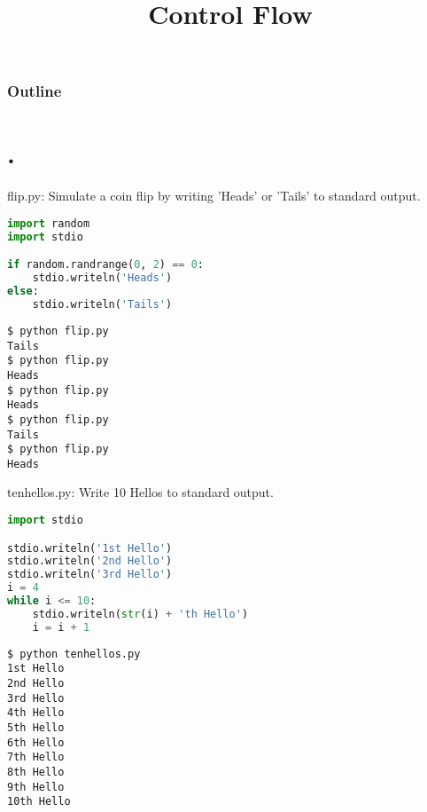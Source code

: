 \documentclass[8pt,a4paper,compress,handout]{beamer}
\title{Control Flow}
\date{}
\begin{document}
\begin{frame}
\vfill
\titlepage
\end{frame}

\begin{frame}
\frametitle{Outline}
\tableofcontents
\end{frame}

\section{.}
\begin{frame}[fragile]
\begin{framed}
\tiny flip.py: Simulate a coin flip by writing 'Heads' or 'Tails' to standard output.
\end{framed}

\begin{lstlisting}[language=Python]
import random
import stdio

if random.randrange(0, 2) == 0:
    stdio.writeln('Heads')
else:
    stdio.writeln('Tails')
\end{lstlisting}

\begin{lstlisting}[language={}]
$ python flip.py 
Tails
$ python flip.py 
Heads
$ python flip.py 
Heads
$ python flip.py 
Tails
$ python flip.py 
Heads
\end{lstlisting}
\end{frame}

\begin{frame}[fragile]
\begin{framed}
\tiny tenhellos.py: Write 10 Hellos to standard output.
\end{framed}

\begin{lstlisting}[language=Python]
import stdio

stdio.writeln('1st Hello')
stdio.writeln('2nd Hello')
stdio.writeln('3rd Hello')
i = 4
while i <= 10:
    stdio.writeln(str(i) + 'th Hello')
    i = i + 1
\end{lstlisting}

\begin{lstlisting}[language={}]
$ python tenhellos.py 
1st Hello
2nd Hello
3rd Hello
4th Hello
5th Hello
6th Hello
7th Hello
8th Hello
9th Hello
10th Hello
\end{lstlisting}
\end{frame}
\end{document}
